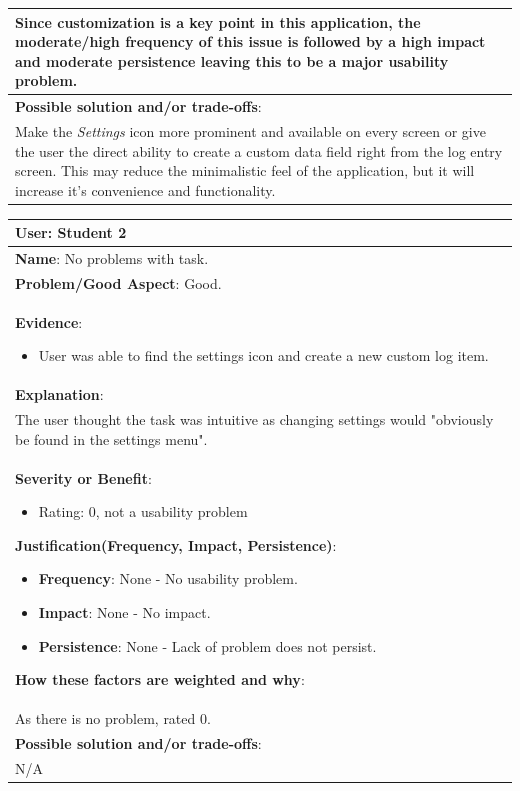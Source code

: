 \documentclass[pdftex,12pt,a4paper]{report}
\begin{document}
\begin{center}
\begin{longtable}{|p{\textwidth}|}
	Since customization is a key point in this application, the moderate/high frequency of this issue is followed by a high impact and moderate persistence leaving this to be a major usability problem.\\
	\hline
	\textbf{Possible solution and/or trade-offs}:\\
	Make the \emph{Settings} icon more prominent and available on every screen or give the user the direct ability to create a custom data field right from the log entry screen. This may reduce the minimalistic feel of the application, but it will increase it's convenience and functionality.\\
	\hline
	\end{longtable}
\end{center}

\begin{center}
	\begin{longtable}{|p{\textwidth}|}
	\hline
	\textbf{User}: Student 2\\
	\hline
	\textbf{Name}: No problems with task.\\
	\hline
	\textbf{Problem/Good Aspect}: Good.\\
	\hline
	\textbf{Evidence}:
	\begin{itemize}
	\item{User was able to find the settings icon and create a new custom log item.}
	\end{itemize}\\
	\hline
	\textbf{Explanation}:\\The user thought the task was intuitive as changing settings would "obviously be found in the settings menu".\\
	\hline
\textbf{Severity or Benefit}:
	\begin{itemize}
	\item{Rating: 0, not a usability problem}
	\end{itemize}
	\textbf{Justification(Frequency, Impact, Persistence)}:
	\begin{itemize}
	\item{\textbf{Frequency}:} None - No usability problem.
	\item{\textbf{Impact}:} None - No impact.
	\item{\textbf{Persistence}:} None - Lack of problem does not persist.
	\end{itemize}
	\textbf{How these factors are weighted and why}:\\
	As there is no problem, rated 0.\\
	\hline
	\textbf{Possible solution and/or trade-offs}:\\
	N/A\\
	\hline
	\end{longtable}
\end{center}
\end{document}
